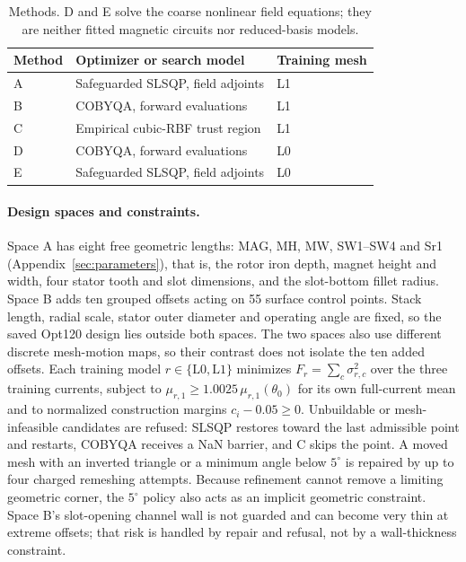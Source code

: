 \begin{table}[H]\centering\small
\caption{Methods. D and E solve the coarse nonlinear field equations; they
are neither fitted magnetic circuits nor reduced-basis models.}
\label{tab:methods}
\begin{tabular}{lll}\toprule
Method & Optimizer or search model & Training mesh\\\midrule
A & Safeguarded SLSQP, field adjoints & L1\\
B & COBYQA, forward evaluations & L1\\
C & Empirical cubic-RBF trust region & L1\\
D & COBYQA, forward evaluations & L0\\
E & Safeguarded SLSQP, field adjoints & L0\\\bottomrule
\end{tabular}
\end{table}

\paragraph{Design spaces and constraints.}
Space A has eight free geometric lengths: MAG, MH, MW, SW1--SW4 and Sr1
(Appendix~\ref{sec:parameters}), that is, the rotor iron depth, magnet
height and width, four stator tooth and slot dimensions, and the slot-bottom
fillet radius. Space B adds ten grouped offsets acting on 55 surface control
points. Stack length, radial scale, stator outer diameter and operating
angle are fixed, so the saved Opt120 design lies outside both spaces. The
two spaces also use different discrete mesh-motion maps, so their contrast
does not isolate the ten added offsets.
Each training model $r\in\{\mathrm{L0},\mathrm{L1}\}$ minimizes
$F_r=\sum_c\sigma_{r,c}^2$ over the three training currents, subject to
$\mu_{r,1}\geq1.0025\,\mu_{r,1}(\theta_0)$ for its own full-current mean and to
normalized construction margins $c_i-0.05\geq0$. Unbuildable or
mesh-infeasible candidates are refused: SLSQP restores toward the last
admissible point and restarts, COBYQA receives a NaN barrier, and C skips
the point. A moved mesh with an inverted triangle or a minimum angle below
$5^\circ$ is repaired by up to four charged remeshing attempts. Because
refinement cannot remove a limiting geometric corner, the $5^\circ$ policy
also acts as an implicit geometric constraint. Space B's slot-opening
channel wall is not guarded and can become very thin at extreme offsets;
that risk is handled by repair and refusal, not by a wall-thickness
constraint.

